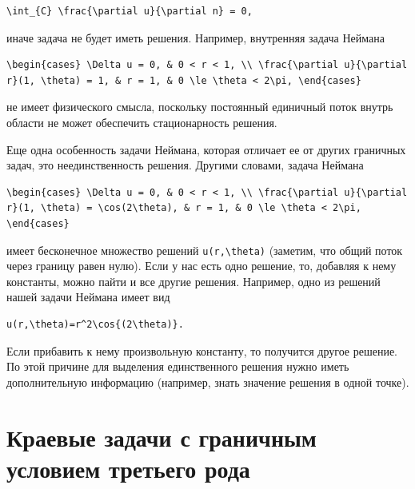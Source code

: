 \documentclass[
  ukrainian,
]{article}
\begin{document}
\begin{verbatim}
\int_{C} \frac{\partial u}{\partial n} = 0,
\end{verbatim}

иначе задача не будет иметь решения. Например, внутренняя задача Неймана

\begin{verbatim}
\begin{cases} \Delta u = 0, & 0 < r < 1, \\ \frac{\partial u}{\partial r}(1, \theta) = 1, & r = 1, & 0 \le \theta < 2\pi, \end{cases}
\end{verbatim}

не имеет физического смысла, поскольку постоянный единичный поток внутрь
области не может обеспечить стационарность решения.

Еще одна особенность задачи Неймана, которая отличает ее от других
граничных задач, это неединственность решения. Другими словами, задача
Неймана

\begin{verbatim}
\begin{cases} \Delta u = 0, & 0 < r < 1, \\ \frac{\partial u}{\partial r}(1, \theta) = \cos(2\theta), & r = 1, & 0 \le \theta < 2\pi, \end{cases}
\end{verbatim}

имеет бесконечное множество решений \texttt{u(r,\textbackslash{}theta)}
(заметим, что общий поток через границу равен нулю). Если у нас есть
одно решение, то, добавляя к нему константы, можно пайти и все другие
решения. Например, одно из решений нашей задачи Неймана имеет вид

\begin{verbatim}
u(r,\theta)=r^2\cos{(2\theta)}.
\end{verbatim}

Если прибавить к нему произвольную константу, то получится другое
решение. По этой причине для выделения единственного решения нужно иметь
дополнительную информацию (например, знать значение решения в одной
точке).

\section{\texorpdfstring{\textbf{Краевые задачи с граничным условием}
третьего
рода}{Краевые задачи с граничным условием третьего рода}}\label{ux43aux440ux430ux435ux432ux44bux435-ux437ux430ux434ux430ux447ux438-ux441-ux433ux440ux430ux43dux438ux447ux43dux44bux43c-ux443ux441ux43bux43eux432ux438ux435ux43c-ux442ux440ux435ux442ux44cux435ux433ux43e-ux440ux43eux434ux430}
\end{document}
